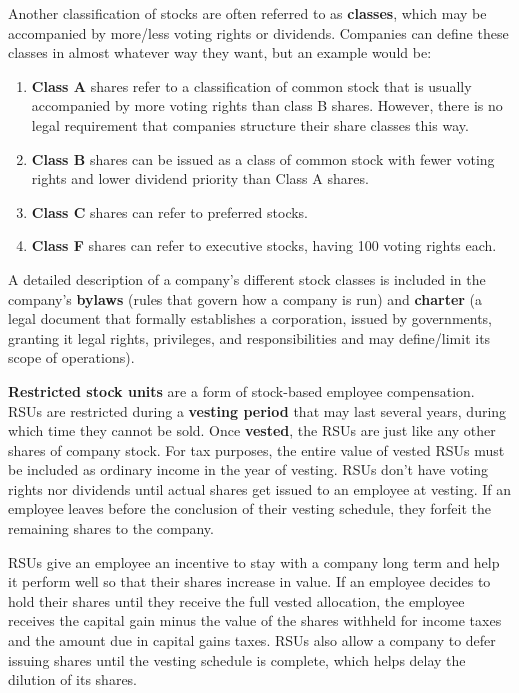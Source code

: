 \documentclass{article}
\begin{document}
  \begin{definition}
    Another classification of stocks are often referred to as \textbf{classes}, which may be accompanied by more/less voting rights or dividends. Companies can define these classes in almost whatever way they want, but an example would be: 
    \begin{enumerate}
        \item \textbf{Class A} shares refer to a classification of common stock that is usually accompanied by more voting rights than class B shares. However, there is no legal requirement that companies structure their share classes this way. 
        \item \textbf{Class B} shares can be issued as a class of common stock with fewer voting rights and lower dividend priority than Class A shares. 
        \item \textbf{Class C} shares can refer to preferred stocks. 
        \item \textbf{Class F} shares can refer to executive stocks, having 100 voting rights each. 
    \end{enumerate}
    A detailed description of a company's different stock classes is included in the company's \textbf{bylaws} (rules that govern how a company is run) and \textbf{charter} (a legal document that formally establishes a corporation, issued by governments, granting it legal rights, privileges, and responsibilities and may define/limit its scope of operations).  
  \end{definition}

  \begin{definition}[RSUs]
    \textbf{Restricted stock units} are a form of stock-based employee compensation. RSUs are restricted during a \textbf{vesting period} that may last several years, during which time they cannot be sold. Once \textbf{vested}, the RSUs are just like any other shares of company stock. For tax purposes, the entire value of vested RSUs must be included as ordinary income in the year of vesting. RSUs don't have voting rights nor dividends until actual shares get issued to an employee at vesting. If an employee leaves before the conclusion of their vesting schedule, they forfeit the remaining shares to the company.

    RSUs give an employee an incentive to stay with a company long term and help it perform well so that their shares increase in value. If an employee decides to hold their shares until they receive the full vested allocation, the employee receives the capital gain minus the value of the shares withheld for income taxes and the amount due in capital gains taxes. RSUs also allow a company to defer issuing shares until the vesting schedule is complete, which helps delay the dilution of its shares. 
  \end{definition}
\end{document}
